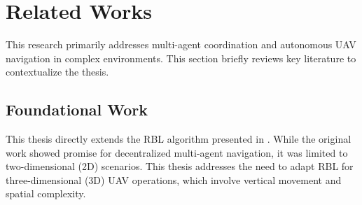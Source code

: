 \section{Related Works}

  This research primarily addresses multi-agent coordination and autonomous UAV navigation in complex environments. This section briefly reviews key literature to contextualize the thesis.
  \subsection{Foundational Work}
    This thesis directly extends the \ac{RBL} algorithm presented in \cite{rbl_paper}. 
    While the original work showed promise for decentralized multi-agent navigation, it was limited to two-dimensional (2D) scenarios. 
    This thesis addresses the need to adapt \ac{RBL} for three-dimensional (3D) \ac{UAV} operations, which involve vertical movement and spatial complexity.

